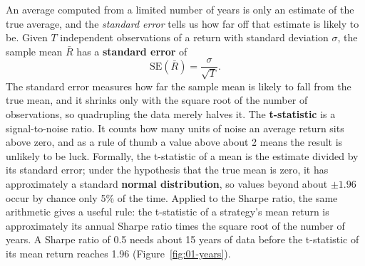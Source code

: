 An average computed from a limited number of years is only an estimate of the true average, and the \emph{standard error} tells us how far off that estimate is likely to be. Given $T$ independent observations of a return with standard deviation $\sigma$, the sample mean $\bar{R}$ has a \textbf{standard error} of
\begin{equation}
  \mathrm{SE}(\bar{R}) = \frac{\sigma}{\sqrt{T}}.
  \label{eq:01-se}
\end{equation}
The standard error measures how far the sample mean is likely to fall from the true mean, and it shrinks only with the square root of the number of observations, so quadrupling the data merely halves it. The \textbf{t-statistic} is a signal-to-noise ratio. It counts how many units of noise an average return sits above zero, and as a rule of thumb a value above about 2 means the result is unlikely to be luck. Formally, the t-statistic of a mean is the estimate divided by its standard error; under the hypothesis that the true mean is zero, it has approximately a standard \textbf{normal distribution}, so values beyond about $\pm 1.96$ occur by chance only 5\% of the time. Applied to the Sharpe ratio, the same arithmetic gives a useful rule: the t-statistic of a strategy's mean return is approximately its annual Sharpe ratio times the square root of the number of years. A Sharpe ratio of 0.5
needs about 15 years of data before the t-statistic of its mean return reaches 1.96 (Figure~\ref{fig:01-years}).




